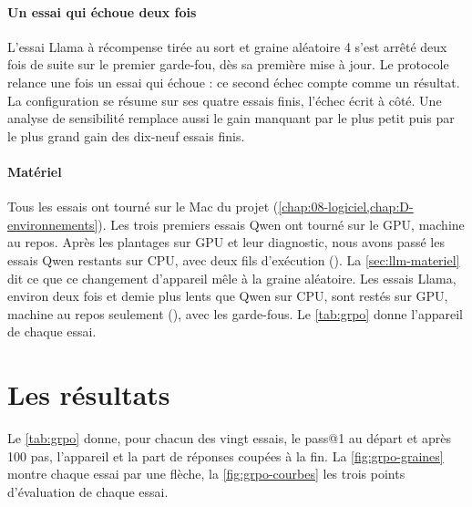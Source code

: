 \paragraph{Un essai qui échoue deux fois} L'essai Llama à récompense tirée au sort et graine aléatoire 4
s'est arrêté deux fois de suite sur le premier garde-fou, dès sa première mise à jour. Le protocole relance
une fois un essai qui échoue : ce second échec compte comme un résultat. La configuration se résume sur ses quatre essais finis,
l'échec écrit à côté. Une analyse de sensibilité remplace aussi le gain manquant par le plus petit
puis par le plus grand gain des dix-neuf essais finis.

\paragraph{Matériel} Tous les essais ont tourné sur le Mac du projet
(\cref{chap:08-logiciel,chap:D-environnements}). Les trois premiers essais Qwen ont tourné sur le
GPU, machine au repos. Après les plantages sur GPU et leur diagnostic, nous avons passé les essais Qwen
restants sur CPU, avec deux fils d'exécution (). La \cref{sec:llm-materiel} dit ce que ce
changement d'appareil mêle à la graine aléatoire. Les essais
Llama, environ deux fois et demie plus lents que Qwen sur CPU, sont restés sur GPU, machine au repos
seulement (), avec les garde-fous. Le \cref{tab:grpo} donne l'appareil de chaque
essai.

\section{Les résultats}
\label{sec:llm-resultats}


Le \cref{tab:grpo} donne, pour chacun des vingt essais, le pass@1 au départ et après 100 pas,
l'appareil et la part de réponses coupées à la fin. La \cref{fig:grpo-graines} montre chaque essai
par une flèche, la \cref{fig:grpo-courbes} les trois points d'évaluation de chaque essai.


